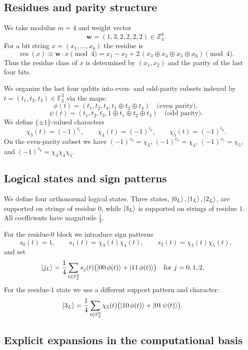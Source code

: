 \documentclass[pdflatex,sn-nature]{sn-jnl}%
\theoremstyle{thmstyleone}%
\theoremstyle{thmstyletwo}%
\theoremstyle{thmstylethree}%
\begin{document}
\begin{appendices}
\subsection{Residues and parity structure}

We take modulus $m=4$ and weight vector
\[
    \mathbf w=(1,3,2,2,2,2)\in\mathbb Z_4^6.
\]
For a bit string $x=(x_1,\dots,x_6)$ the residue is
\[
    \operatorname{res}(x)\equiv \mathbf w\cdot  x \pmod 4
    =  x_1 - x_2 + 2\,(x_3\oplus x_4\oplus x_5\oplus x_6)\pmod 4.
\]
Thus the residue class of $x$ is determined by $(x_1,x_2)$ and the parity of the last four bits.

We organize the last four qubits into even- and odd-parity subsets indexed by $t=(t_1,t_2,t_3)\in\mathbb{F}_2^3$ via the maps:
\[
    \phi(t)=(t_1,t_2,t_3,t_1\oplus t_2\oplus t_3)\quad\text{(even parity)},
\]
\[
    \psi(t)=(t_1,t_2,t_3,1\oplus t_1\oplus t_2\oplus t_3)\quad\text{(odd parity)}.
\]
We define $\{\pm1\}$-valued characters
\[
    \chi_3(t)=(-1)^{t_1},\qquad \chi_4(t)=(-1)^{t_2},\qquad \chi_5(t)=(-1)^{t_3}.
\]
On the even-parity subset we have
$(-1)^{v_3}=\chi_3$, $(-1)^{v_4}=\chi_4$, $(-1)^{v_5}=\chi_5$, and
$(-1)^{v_6}=\chi_3\chi_4\chi_5$.

\subsection{Logical states and sign patterns}

We define four orthonormal logical states. Three states, $\ket{0_L},\ket{1_L},\ket{2_L}$, are supported on strings of residue $0$, while $\ket{3_L}$ is supported on strings of residue $1$. All coefficients have magnitude $\tfrac{1}{4}$.

For the residue-$0$ block we introduce sign patterns
\[
    s_0(t)=1,\qquad s_1(t)=\chi_3(t)\chi_4(t),\qquad s_2(t)=\chi_3(t)\chi_5(t),
\]
and set
\begin{align}
    \ket{j_L}
      &=\frac{1}{4}\sum_{t\in\mathbb{F}_2^3}s_j(t)
        \bigl(\ket{00\,\phi(t)}+\ket{11\,\phi(t)}\bigr)
        \quad \text{for } j=0,1,2. \label{eq:res0-block}
\end{align}
For the residue-$1$ state we use a different support pattern and character:
\begin{align}
    \ket{3_L}
      &=\frac{1}{4}\sum_{t\in\mathbb{F}_2^3}\chi_5(t)
        \bigl(\ket{10\,\phi(t)}+\ket{01\,\psi(t)}\bigr).
      \label{eq:res1-state}
\end{align}

\subsection{Explicit expansions in the computational basis}


\end{appendices}
\end{document}
